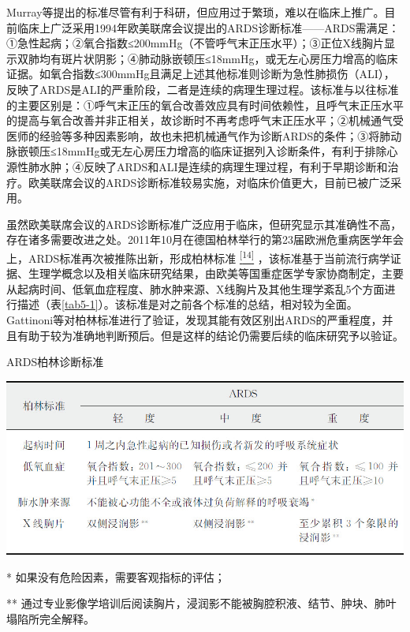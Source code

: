 Murray等提出的标准尽管有利于科研，但应用过于繁琐，难以在临床上推广。目前临床上广泛采用1994年欧美联席会议提出的ARDS诊断标准------ARDS需满足：①急性起病；②氧合指数≤200mmHg（不管呼气末正压水平）；③正位X线胸片显示双肺均有斑片状阴影；④肺动脉嵌顿压≤18mmHg，或无左心房压力增高的临床证据。如氧合指数≤300mmHg且满足上述其他标准则诊断为急性肺损伤（ALI），反映了ARDS是ALI的严重阶段，二者是连续的病理生理过程。该标准与以往标准的主要区别是：①呼气末正压的氧合改善效应具有时间依赖性，且呼气末正压水平的提高与氧合改善并非正相关，故诊断时不再考虑呼气末正压水平；②机械通气受医师的经验等多种因素影响，故也未把机械通气作为诊断ARDS的条件；③将肺动脉嵌顿压≤18mmHg或无左心房压力增高的临床证据列入诊断条件，有利于排除心源性肺水肿；④反映了ARDS和ALI是连续的病理生理过程，有利于早期诊断和治疗。欧美联席会议的ARDS诊断标准较易实施，对临床价值更大，目前已被广泛采用。

虽然欧美联席会议的ARDS诊断标准广泛应用于临床，但研究显示其准确性不高，存在诸多需要改进之处。2011年10月在德国柏林举行的第23届欧洲危重病医学年会上，ARDS标准再次被推陈出新，形成柏林标准
\protect\hyperlink{text00011.htmlux5cux23ch14-10}{\textsuperscript{{[}14{]}}}
，该标准基于当前流行病学证据、生理学概念以及相关临床研究结果，由欧美等国重症医学专家协商制定，主要从起病时间、低氧血症程度、肺水肿来源、X线胸片及其他生理学紊乱5个方面进行描述（表\ref{tab5-1}）。该标准是对之前各个标准的总结，相对较为全面。Gattinoni等对柏林标准进行了验证，发现其能有效区别出ARDS的严重程度，并且有助于较为准确地判断预后。但是这样的结论仍需要后续的临床研究予以验证。

\begin{table}[htbp]
{\centering
\caption{ARDS柏林诊断标准}
\label{tab5-1}
\includegraphics{./images/Image00046.jpg}}

\footnotesize
* 如果没有危险因素，需要客观指标的评估；

**
通过专业影像学培训后阅读胸片，浸润影不能被胸腔积液、结节、肿块、肺叶塌陷所完全解释。
\end{table}




